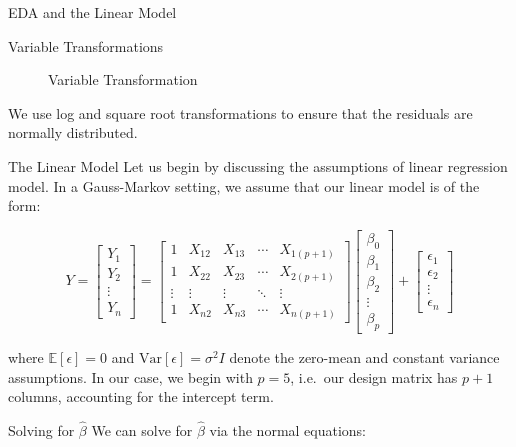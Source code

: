 \documentclass[
  ignorenonframetext,
]{beamer}
\begin{document}
\begin{frame}[fragile]{EDA and the Linear Model}
\begin{block}{Variable Transformations}
\begin{figure}[H]
{}

\caption{Variable Transformation}

\end{figure}%

We use log and square root transformations to ensure that the residuals
are normally distributed.
\end{block}

\begin{block}{The Linear Model}
\label{the-linear-model}
Let us begin by discussing the assumptions of linear regression model.
In a Gauss-Markov setting, we assume that our linear model is of the
form:

\[
Y = \begin{bmatrix} Y_1 \\ Y_2 \\ \vdots \\ Y_n \end{bmatrix} = 
\begin{bmatrix}
1 & X_{12} & X_{13} & \cdots & X_{1(p+1)} \\
1 & X_{22} & X_{23} & \cdots & X_{2(p+1)} \\
\vdots & \vdots & \vdots & \ddots & \vdots \\
1 & X_{n2} & X_{n3} & \cdots & X_{n(p+1)}
\end{bmatrix} 
\begin{bmatrix} \beta_0 \\ \beta_1 \\ \beta_2 \\ \vdots \\ \beta_p \end{bmatrix} + 
\begin{bmatrix} \epsilon_1 \\ \epsilon_2 \\ \vdots \\ \epsilon_n \end{bmatrix}
\]

where \(\mathbb{E}[\epsilon] = 0\) and
\(\text{Var}[\epsilon] = \sigma^2I\) denote the zero-mean and constant
variance assumptions. In our case, we begin with \(p = 5\), i.e.~our
design matrix has \(p+1\) columns, accounting for the intercept term.
\end{block}

\begin{block}{Solving for \(\hat{\beta}\)}
\label{solving-for-hatbeta}
We can solve for \(\hat{\beta}\) via the normal equations:


\end{block}
\end{frame}
\end{document}
